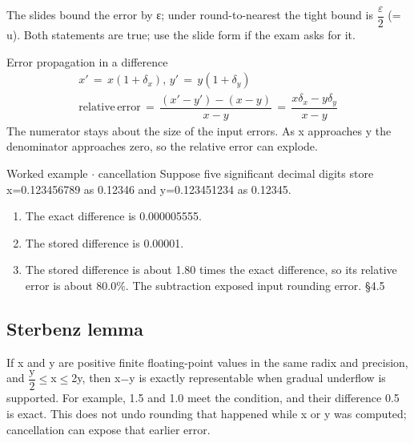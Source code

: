 \documentclass[11pt]{article}
\begin{document}
\begin{keepsection}
\begin{keepsection}
The slides bound the error by ε; under round-to-nearest the tight bound is {\small\ensuremath{\dfrac{ε}{2}}} (= u). Both statements are true; use the slide form if the exam asks for it.

\begin{equationcard}{Error propagation in a difference}
\[ \begin{gathered} {x}'\, =\, {x}(1+δ_{{x}}),\, {y}'\, =\, {y}(1+δ_{{y}}) \\ \text{relative}\, \text{error}\, =\, \dfrac{({x}'-{y}')-({x}-{y})}{{x}-{y}}\, =\, \dfrac{{x}δ_{{x}}-{y}δ_{{y}}}{{x}-{y}} \end{gathered} \]
{\small The numerator stays about the size of the input errors. As x approaches y the denominator approaches zero, so the relative error can explode.}
\end{equationcard}

\begin{workedbox}{Worked example \ensuremath{\cdot} cancellation}
Suppose five significant decimal digits store x=0.123456789 as 0.12346 and y=0.123451234 as 0.12345.

\begin{enumerate}
\item The exact difference is 0.000005555.
\item The stored difference is 0.00001.
\item The stored difference is about 1.80 times the exact difference, so its relative error is about 80.0\%. The subtraction exposed input rounding error. \hfill{\small\color{FAUblue}§4.5}
\end{enumerate}
\end{workedbox}
\end{keepsection}

\begin{keepsection}
\subsection{Sterbenz lemma}

If x and y are positive finite floating-point values in the same radix and precision, and {\small\ensuremath{\dfrac{\mathrm{y}}{2}}}\ensuremath{\leq}x\ensuremath{\leq}2y, then x\ensuremath{-}y is exactly representable when gradual underflow is supported. For example, 1.5 and 1.0 meet the condition, and their difference 0.5 is exact. This does not undo rounding that happened while x or y was computed; cancellation can expose that earlier error.
\end{keepsection}


\end{keepsection}
\end{document}
